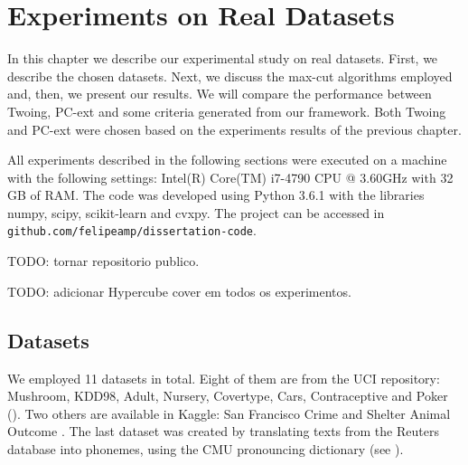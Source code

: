 \newpage

\chapter{Experiments on Real Datasets}
\label{chap:experiments-datasets}


In this chapter we describe our experimental study on real datasets. First, we describe the chosen datasets. Next, we discuss the max-cut algorithms 
employed and, then, we present our results. We will compare the performance between Twoing, PC-ext and some criteria generated from our framework. Both Twoing and PC-ext were chosen based on the experiments results of the previous chapter.

All  experiments described in the following sections were executed on a machine with the following settings: Intel(R) Core(TM) i7-4790 CPU @ 3.60GHz with 32 GB of RAM. The code was developed using Python 3.6.1 with the libraries numpy, scipy, scikit-learn and cvxpy.
The project can be accessed in {\tt github.com/felipeamp/dissertation-code}.

TODO: tornar repositorio publico.

TODO: adicionar Hypercube cover em todos os experimentos.

\section{Datasets}
We employed 11 datasets in total. Eight of them are from the UCI repository:
Mushroom, KDD98, Adult, Nursery, Covertype, Cars, Contraceptive and Poker (\cite{Lichman:2013}).
Two others are available in Kaggle: San Francisco Crime and Shelter Animal Outcome
\cite{SFC,AnimalShelter}. The last dataset was created by translating texts from the Reuters database \cite{Lichman:2013} into phonemes, using the CMU pronouncing dictionary (see \cite{CMU-PD}).

